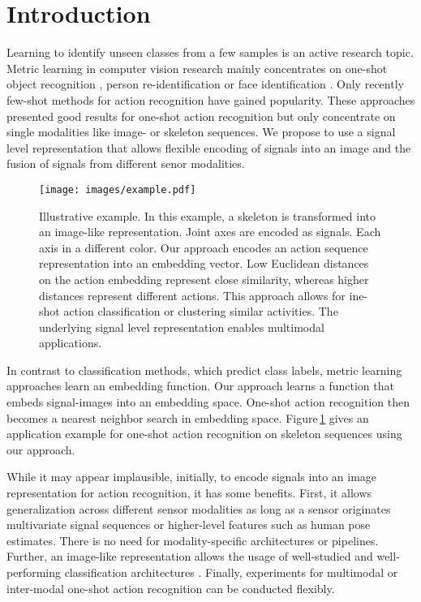 \documentclass[10pt,conference,a4paper]{IEEEtran}
\def\fignamelong{Figure\,}
\begin{document}
\section{Introduction}
Learning to identify unseen classes from a few samples is an active research topic.  Metric learning in computer vision research mainly concentrates on one-shot object recognition \cite{fu2015zero}, person re-identification \cite{yi2014deep,wojke2018deep} or face identification \cite{schroff2015facenet}. Only recently few-shot methods for action recognition \cite{careaga2019metric, jasani2019skeleton, liu2019ntu} have gained popularity. These approaches presented good results for one-shot action recognition but only concentrate on single modalities like image- or skeleton sequences. We propose to use a signal level representation that allows flexible encoding of signals into an image and the fusion of signals from different senor modalities.



\begin{figure}
    \centering
    \texttt{[image: images/example.pdf]}
    \caption{Illustrative example. In this example, a skeleton is transformed into an image-like representation. Joint axes are encoded as signals. Each axis in a different color. Our approach encodes an action sequence representation into an embedding vector. Low Euclidean distances on the action embedding represent close similarity, whereas higher distances represent different actions. This approach allows for ine-shot action classification or clustering similar activities. The underlying signal level representation enables multimodal applications.}
    \label{fig:overview}
\end{figure}

In contrast to classification methods, which predict class labels, metric learning approaches learn an embedding function.
Our approach learns a function that embeds signal-images into an embedding space.
One-shot action recognition then becomes a nearest neighbor search in embedding space. \fignamelong \ref{fig:overview} gives an application example for one-shot action recognition on skeleton sequences using our approach. 


While it may appear implausible, initially, to encode signals into an image representation for action recognition, it has some benefits.
First, it allows generalization across different sensor modalities as long as a sensor originates multivariate signal sequences or higher-level features such as human pose estimates. There is no need for modality-specific architectures or pipelines.
Further, an image-like representation allows the usage of well-studied and well-performing classification architectures \cite{he2016deep}. 
Finally, experiments for multimodal or inter-modal one-shot action recognition can be conducted flexibly.
\end{document}
